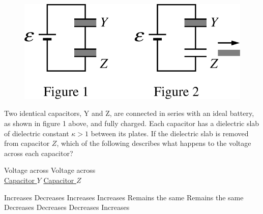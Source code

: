 \begin{figure}[H]
    \centering
    \includegraphics[scale=0.25]{images/img-014-040.png}
\end{figure}

\begin{questions}\setcounter{question}{32}\question
Two identical capacitors, Y and Z, are connected in series with an ideal battery, as shown in figure 1 above, and fully charged. Each capacitor has a dielectric slab of dielectric constant $\kappa > 1$ between its plates. If the dielectric slab is removed from capacitor $Z$, which of the following describes what happens to the voltage across each capacitor?

\tabto{0.75cm} Voltage across
\tabto{5.00cm} Voltage across\\
\tabto{0.75cm} \underline{Capacitor $Y$}
\tabto{5.00cm} \underline{Capacitor $Z$}

\begin{choices}
\choice Increases        \tabto{4.25cm} Decreases
\choice Increases        \tabto{4.25cm} Increases
\choice Remains the same \tabto{4.25cm} Remains the same
\choice Decreases        \tabto{4.25cm} Decreases
\choice Decreases        \tabto{4.25cm} Increases
\end{choices}\end{questions}
